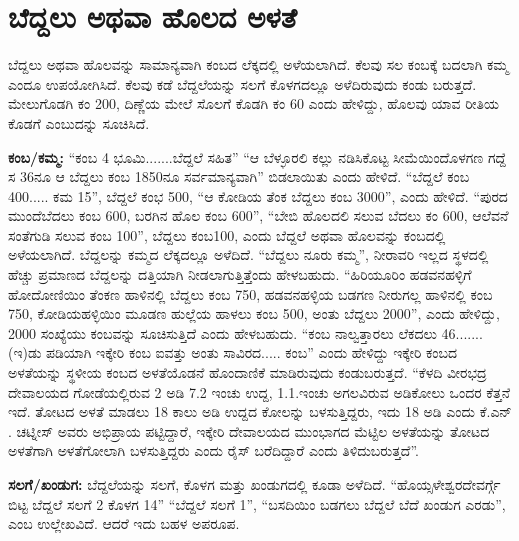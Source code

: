 \section{ಬೆದ್ದಲು ಅಥವಾ ಹೊಲದ ಅಳತೆ}

ಬೆದ್ದಲು ಅಥವಾ ಹೊಲವನ್ನು ಸಾಮಾನ್ಯವಾಗಿ ಕಂಬದ ಲೆಕ್ಕದಲ್ಲಿ ಅಳೆಯಲಾಗಿದೆ. ಕೆಲವು ಸಲ ಕಂಬಕ್ಕೆ ಬದಲಾಗಿ ಕಮ್ಮ ಎಂದೂ ಉಪಯೋಗಿಸಿದೆ. ಕೆಲವು ಕಡೆ ಬೆದ್ದಲೆಯನ್ನು ಸಲಗೆ ಕೊಳಗದಲ್ಲೂ ಅಳೆದಿರುವುದು ಕಂಡು ಬರುತ್ತದೆ. ಮೇಲುಗೊಡಗಿ ಕಂ 200, ದಿಣ್ಣೆಯ ಮೇಲೆ ಸೊಲಗೆ ಕೊಡಗಿ ಕಂ 60 ಎಂದು ಹೇಳಿದ್ದು, ಹೊಲವು ಯಾವ ರೀತಿಯ ಕೊಡಗೆ ಎಂಬುದನ್ನು ಸೂಚಿಸಿದೆ.

\textbf{ಕಂಬ/ಕಮ್ಮ:} “ಕಂಬ 4 ಭೂಮಿ.......ಬೆದ್ದಲೆ ಸಹಿತ” “ಆ ಬೆಳ್ಳೂರಲಿ ಕಲ್ಲು ನಡಿಸಿಕೊಟ್ಟ ಸೀಮೆಯಿಂದೊಳಗಣ ಗದ್ದೆ ಸ 36ನೂ ಆ ಬೆದ್ದಲು ಕಂಬ 1850ನೂ ಸರ್ವಮಾನ್ಯವಾಗಿ” ಬಿಡಲಾಯಿತು ಎಂದು ಹೇಳಿದೆ. “ಬೆದ್ದಲೆ ಕಂಬ 400..... ಕಮ 15”, ಬೆದ್ದಲೆ ಕಂಭ 500, “ಆ ಕೋಡಿಯ ತೆಂಕ ಬೆದ್ದಲು ಕಂಬ 3000”, ಎಂದು ಹೇಳಿದೆ. “ಪುರದ ಮುಂದೆ\break ಬೆದಲು ಕಂಬ 600, ಬರಗಿನ ಹೊಲ ಕಂಬ 600”, “ಬೇಬಿ ಹೊಲದಲಿ ಸಲುವ ಬೆದಲು ಕಂ 600, ಆಲೆವನೆ ಸಂತೆಗುಡಿ ಸಲುವ ಕಂಬ 100”, ಬೆದ್ದಲು ಕಂಬ100, ಎಂದು ಬೆದ್ದಲೆ ಅಥವಾ ಹೊಲವನ್ನು ಕಂಬದಲ್ಲಿ ಅಳೆಯಲಾಗಿದೆ. ಬೆದ್ದಲನ್ನು ಕಮ್ಮದ ಲೆಕ್ಕದಲ್ಲೂ ಅಳೆದಿದೆ. “ಬೆದ್ದಲು ನೂರು ಕಮ್ಮ”, ನೀರಾವರಿ ಇಲ್ಲದ ಸ್ಥಳದಲ್ಲಿ ಹೆಚ್ಚು ಪ್ರಮಾಣದ ಬೆದ್ದಲನ್ನು ದತ್ತಿಯಾಗಿ ನೀಡಲಾಗುತ್ತಿತ್ತೆಂದು ಹೇಳಬಹುದು. “ಹಿರಿಯೂರಿಂ ಹಡವನಹಳ್ಳಿಗೆ ಹೋದೋಣಿಯಿಂ ತೆಂಕಣ ಹಾಳಿನಲ್ಲಿ ಬೆದ್ದಲು ಕಂಬ 750, ಹಡವನಹಳ್ಳಿಯ ಬಡಗಣ ನೀರುಗಲ್ಲ ಹಾಳಿನಲ್ಲಿ ಕಂಬ 750, ಕೋಡಿಯಹಳ್ಳಿಯಿಂ ಮೂಡಣ ಹುಲ್ಲೆಯ ಹಾಳಲು ಕಂಬ 500, ಅಂತು ಬೆದ್ದಲು 2000”, ಎಂದು ಹೇಳಿದ್ದು, 2000 ಸಂಖ್ಯೆಯು ಕಂಬವನ್ನು ಸೂಚಿಸುತ್ತಿದೆ ಎಂದು ಹೇಳಬಹುದು. “ಕಂಬ ನಾಲ್ವತ್ತಾರಲು ಲೆಕದಲು 46.......(ಇ)ಡು ಪಡಿಯಾಗಿ ಇಕ್ಕೇರಿ ಕಂಬ ಐವತ್ತು ಅಂತು ಸಾವಿರದ..... ಕಂಬ” ಎಂದು ಹೇಳಿದ್ದು ಇಕ್ಕೇರಿ ಕಂಬದ ಅಳತೆಯನ್ನು ಸ್ಥಳೀಯ ಕಂಬದ ಅಳತೆಯೊಡನೆ ಹೊಂದಾಣಿಕೆ ಮಾಡಿರುವುದು ಕಂಡುಬರುತ್ತದೆ. “ಕೆಳದಿ ವೀರಭದ್ರ ದೇವಾಲಯದ ಗೋಡೆಯಲ್ಲಿರುವ 2 ಅಡಿ 7.2 ಇಂಚು ಉದ್ದ, 1.1.ಇಂಚು ಅಗಲವಿರುವ ಅಡಿಕೋಲು ಒಂದರ ಕೆತ್ತನೆ ಇದೆ. ತೋಟದ ಅಳತೆ ಮಾಡಲು 18 ಕಾಲು ಅಡಿ ಉದ್ದದ ಕೋಲನ್ನು ಬಳಸುತ್ತಿದ್ದರು, ಇದು 18 ಅಡಿ ಎಂದು ಕೆ.ಎನ್​. ಚಟ್ನೀಸ್​ ಅವರು ಅಭಿಪ್ರಾಯ ಪಟ್ಟಿದ್ದಾರೆ, ಇಕ್ಕೇರಿ ದೇವಾಲಯದ ಮುಂಭಾಗದ ಮೆಟ್ಟಿಲ ಅಳತೆಯನ್ನು ತೋಟದ ಅಳತೆಗಾಗಿ ಅಳತೆಗೋಲಾಗಿ ಬಳಸುತ್ತಿದ್ದರು ಎಂದು ರೈಸ್​ ಬರೆದಿದ್ದಾರೆ ಎಂದು ತಿಳಿದುಬರುತ್ತದೆ”.

\textbf{ಸಲಗೆ/ಖಂಡುಗ:} ಬೆದ್ದಲೆಯನ್ನು ಸಲಗೆ, ಕೊಳಗ ಮತ್ತು ಖಂಡುಗದಲ್ಲಿ ಕೂಡಾ ಅಳೆದಿದೆ. “ಹೊಯ್ಸಳೇಶ್ವರ\break ದೇವರ್ಗ್ಗೆ ಬಿಟ್ಟ ಬೆದ್ದಲೆ ಸಲಗೆ 2 ಕೊಳಗ 14” “ಬೆದ್ದಲೆ ಸಲಗೆ 1”, “ಬಸದಿಯಿಂ ಬಡಗಲು ಬೆದ್ದಲೆ ಬೆದೆ ಖಂಡುಗ ಎರಡು”, ಎಂಬ ಉಲ್ಲೇಖವಿದೆ. ಆದರೆ ಇದು ಬಹಳ ಅಪರೂಪ.

